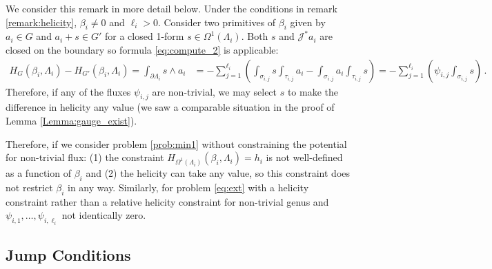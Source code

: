 \documentclass[11pt]{article}
\theoremstyle{plain}
\theoremstyle{definition}
\theoremstyle{remark}
\newcommand{\ST}{\Lambda}
\begin{document}
We consider this remark in more detail below. Under the conditions in remark \ref{remark:helicity}, \(\beta_i \neq 0\) and \(\ell_i >0\). Consider two primitives of \(\beta_i\) given by \(a_i \in G\) and \(a_i + s \in G'\) for a closed 1-form \(s \in  \Omega^1(\ST_i)\). Both \(s\) and \(\mathcal{J}^* a_i\) are closed on the boundary so formula \eqref{eq:compute_2} is applicable:
\begin{align*}
    H_G (\beta_i, \ST_i) - H_{G'} (\beta_i, \ST_i)  =  \int_{\partial \ST_i}  \!  s \wedge a_i &=  - \sum_{j=1}^{\ell_i}  \left(\int_{\sigma_{i,j}} \! s    \int_{\tau_{i,j}}  \! a_i -\int_{\sigma_{i,j}}  \! a_i \int_{\tau_{i,j}}  \! s  \right) 
    =  - \sum_{j=1}^{\ell_i}  \left( \psi_{i,j} \int_{\sigma_{i,j}}  \!  s    \right) 
     \, .
\end{align*}
Therefore, if any of the fluxes \(\psi_{i,j}\) are non-trivial, we may select \(s\) to make the difference in helicity any value (we saw a comparable situation in the proof of Lemma \ref{Lemma:gauge_exist}). 


Therefore, if we consider problem \eqref{prob:min1} without constraining the potential for non-trivial flux: (1) the constraint \(H_{\Omega^1(\ST_i)} (\beta_i , \ST_i) = h_i\) is not well-defined as a function of \(\beta_i\) and (2) the helicity can take any value, so this constraint does not restrict \(\beta_i\) in any way. Similarly, for problem \eqref{eq:ext} with a helicity constraint rather than a relative helicity constraint for non-trivial genus and \(\psi_{i,1}, \dots, \psi_{i,\ell_i} \) not identically zero. 





\subsection{Jump Conditions}
\end{document}
